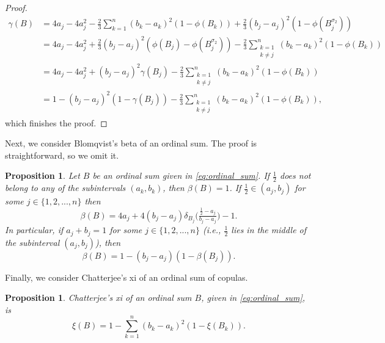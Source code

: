 \documentclass[12pt,a4paper]{amsart}
\newtheorem{proposition}[theorem]{Proposition}
\theoremstyle{definition}
\begin{document}
\begin{proof}
\begin{align*}
   \gamma(B) &= 4a_j - 4a_j^2 - \tfrac23\sum_{k=1}^n (b_k-a_k)^2(1-\phi(B_k)) + \tfrac23(b_j-a_j)^2(1-\phi(B_j^{\sigma_2})) \\
   &= 4a_j - 4a_j^2 + \tfrac23(b_j-a_j)^2(\phi(B_j)-\phi(B_j^{\sigma_2})) - \tfrac23\sum_{\substack{k=1 \\ k\ne j}}^n (b_k-a_k)^2(1-\phi(B_k))\\
   &= 4a_j - 4a_j^2 + (b_j-a_j)^2\gamma(B_j) - \tfrac23\sum_{\substack{k=1 \\ k\ne j}}^n (b_k-a_k)^2(1-\phi(B_k))\\
   &= 1 - (b_j-a_j)^2(1-\gamma(B_j)) - \tfrac23\sum_{\substack{k=1 \\ k\ne j}}^n (b_k-a_k)^2(1-\phi(B_k)),
\end{align*}
which finishes the proof.
\end{proof}

Next, we consider Blomqvist's beta of an ordinal sum. The proof is straightforward, so we omit it. 

\begin{proposition}\label{prop:ordinal-beta}
Let $B$ be an ordinal sum given in \eqref{eq:ordinal_sum}. If $\tfrac12$ does not belong to any of the subintervals $(a_k, b_k)$, then $\beta(B) = 1$. 
If $\tfrac12 \in (a_j, b_j)$ for some $j \in \{1, 2, ..., n\}$ then
$$ \beta(B) =  4a_j + 4(b_j-a_j)\delta_{B_j}\big(\tfrac{\frac12-a_j}{b_j-a_j}\big) -1. $$  
In particular, if $a_j + b_j = 1$ for some $j \in \{1, 2, ..., n\}$ (i.e., $\tfrac12$ lies in the middle of the subinterval $(a_j, b_j)$), then
$$ \beta(B) =  1 - (b_j-a_j)(1-\beta(B_j)). $$
\end{proposition}

Finally, we consider Chatterjee's xi of an ordinal sum of copulas. 

\begin{proposition}\label{prop:ordinal-xi}
   Chatterjee's xi of an ordinal sum $B$, given in \eqref{eq:ordinal_sum}, is
    \begin{equation} \label{eq:ordinal-xi}
        \xi(B) =  1 - \sum_{k=1}^n (b_k-a_k)^2(1-\xi(B_k)). 
    \end{equation}  
\end{proposition}
\end{document}

